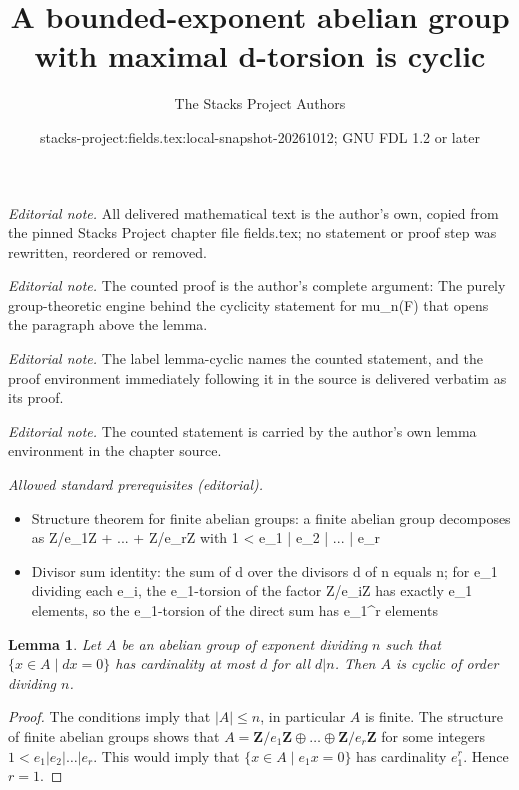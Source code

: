 \documentclass[10pt,a4paper]{amsart}
\title{A bounded-exponent abelian group with maximal d-torsion is cyclic}
\author{The Stacks Project Authors}
\date{stacks-project:fields.tex:local-snapshot-20261012; GNU FDL 1.2 or later}
\theoremstyle{plain}
\newtheorem{lemma}[subsection]{Lemma}
\theoremstyle{definition}
\theoremstyle{remark}
\numberwithin{equation}{subsection}
\begin{document}
\maketitle
\noindent\textit{Editorial note.} All delivered mathematical text is the author's own, copied from the pinned Stacks Project chapter file fields.tex; no statement or proof step was rewritten, reordered or removed.\par\medskip
\noindent\textit{Editorial note.} The counted proof is the author's complete argument: The purely group-theoretic engine behind the cyclicity statement for mu\_n(F) that opens the paragraph above the lemma.\par\medskip
\noindent\textit{Editorial note.} The label lemma-cyclic names the counted statement, and the proof environment immediately following it in the source is delivered verbatim as its proof.\par\medskip
\noindent\textit{Editorial note.} The counted statement is carried by the author's own lemma environment in the chapter source.\par\medskip
\noindent\textit{Allowed standard prerequisites (editorial).}\begin{itemize}
\item Structure theorem for finite abelian groups: a finite abelian group decomposes as Z/e\_1Z + ... + Z/e\_rZ with 1 < e\_1 | e\_2 | ... | e\_r
\item Divisor sum identity: the sum of d over the divisors d of n equals n; for e\_1 dividing each e\_i, the e\_1-torsion of the factor Z/e\_iZ has exactly e\_1 elements, so the e\_1-torsion of the direct sum has e\_1\textasciicircum{}r elements
\end{itemize}\medskip
\begin{lemma}
\label{lemma-cyclic}
Let $A$ be an abelian group of exponent dividing $n$ such that
$\{x \in A \mid dx = 0\}$ has cardinality at most $d$ for all $d | n$.
Then $A$ is cyclic of order dividing $n$.
\end{lemma}

\begin{proof}
The conditions imply that $|A| \leq n$, in particular $A$ is finite.
The structure of finite abelian groups shows that
$A = \mathbf{Z}/e_1\mathbf{Z} \oplus \ldots \oplus \mathbf{Z}/e_r\mathbf{Z}$
for some integers $1 < e_1 | e_2 | \ldots | e_r$. This would imply
that $\{x \in A \mid e_1 x = 0\}$ has cardinality $e_1^r$. Hence
$r = 1$.
\end{proof}
\end{document}
